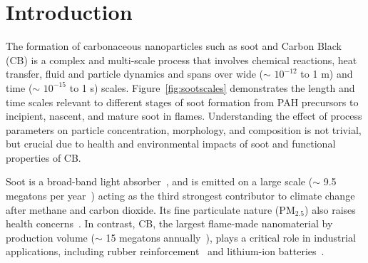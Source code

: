 \section{Introduction}
The formation of carbonaceous nanoparticles such as soot and Carbon Black (CB) is a complex and multi-scale process that involves chemical reactions, heat transfer, fluid and particle dynamics and spans over wide ($\sim$ $10^{-12}$ to 1 m) and time ($\sim$ $10^{-15}$ to 1 s) scales. Figure~\ref{fig:sootscales} demonstrates the length and time scales relevant to different stages of soot formation from PAH precursors to incipient, nascent, and mature soot in flames. Understanding the effect of process parameters on particle concentration, morphology, and composition is not trivial, but crucial due to health and environmental impacts of soot and functional properties of CB.

Soot is a broad-band light absorber~\cite{d2009combustion}, and is emitted on a large scale ($\sim$ 9.5 megatons per year~\citep{myhre2014anthropogenic}) acting as the third strongest contributor to climate change after methane and carbon dioxide. Its fine particulate nature ($\mathrm{PM_{2.5}}$) also raises health concerns~\citep{borm2004inhaled}. In contrast, CB, the largest flame-made nanomaterial by production volume ($\sim$ 15 megatons annually~\citep{rosner2024techno}), plays a critical role in industrial applications, including rubber reinforcement~\citep{international2016carbon} and lithium-ion batteries~\citep{Palomares2010}.


